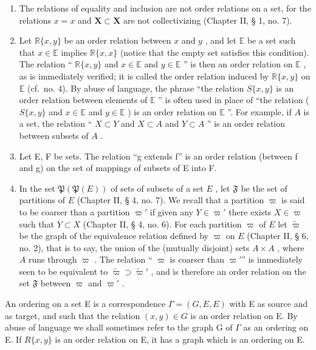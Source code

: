 \begin{enumerate}
\def\labelenumi{(\arabic{enumi})}
\item
  The relations of equality and inclusion are not order relations on a set, for the relations \(x = x\) and \(\mathbf{X} \subset \mathbf{X}\) are not collectivizing (Chapter II, § 1, no. 7).
\item
  Let \(\mathbb{R}\{x, y\}\) be an order relation between \(x\) and \(y\) , and let \(\mathbb{E}\) be a set such that \(x \in \mathbb{E}\) implies \(\mathbb{R}\{x, x\}\) (notice that the empty set satisfies this condition). The relation `` \(\mathbb{R}\{x, y\}\) and \(x \in \mathbb{E}\) and \(y \in \mathbb{E}\) '' is then an order relation on \(\mathbb{E}\) , as is immediately verified; it is called the order relation induced by \(\mathbb{R}\{x, y\}\) on \(\mathbb{E}\) (cf.~no. 4). By abuse of language, the phrase ``the relation \(S\{x, y\}\) is an order relation between elements of \(\mathbb{E}\) '' is often used in place of ``the relation ( \(S\{x, y\}\) and \(x \in \mathbb{E}\) and \(y \in \mathbb{E}\) ) is an order relation on \(\mathbb{E}\) ''. For example, if \(A\) is a set, the relation `` \(X \subset Y\) and \(X \subset A\) and \(Y \subset A\) '' is an order relation between subsets of \(A\) .
\item
  Let E, F be sets. The relation ``g extends f'' is an order relation (between f and g) on the set of mappings of subsets of E into F.
\item
  In the set \(\mathfrak{P}(\mathfrak{P}(E))\) of sets of subsets of a set \(E\) , let \(\mathfrak{F}\) be the set of partitions of \(E\) (Chapter II, § 4, no. 7). We recall that a partition \(\varpi\) is said to be coarser than a partition \(\varpi'\) if given any \(Y \in \varpi'\) there exists \(X \in \varpi\) such that \(Y \subset X\) (Chapter II, § 4, no. 6). For each partition \(\varpi\) of \(E\) let \(\tilde{\varpi}\) be the graph of the equivalence relation defined by \(\varpi\) on \(E\) (Chapter II, § 6, no. 2), that is to say, the union of the (mutually disjoint) sets \(A \times A\) , where \(A\) runs through \(\varpi\) . The relation `` \(\varpi\) is coarser than \(\varpi'\)'' is immediately seen to be equivalent to \(\tilde{\varpi} \supset \tilde{\varpi}'\) , and is therefore an order relation on the set \(\mathfrak{F}\) between \(\varpi\) and \(\varpi'\) .
\end{enumerate}

An ordering on a set E is a correspondence \(\Gamma = (G, E, E)\) with E as source and as target, and such that the relation \((x, y) \in G\) is an order relation on E. By abuse of language we shall sometimes refer to the graph G of \(\Gamma\) as an ordering on E. If \(R\{x, y\}\) is an order relation on E, it has a graph which is an ordering on E.

